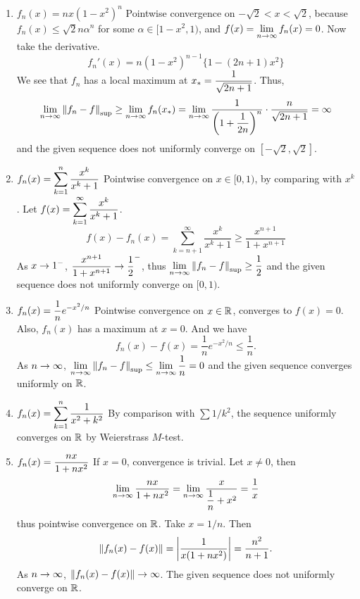 \begin{enumerate}
	\item \(f_n(x) = nx(1-x^2)^n\) \newline
	Pointwise convergence on \(-\sqrt{2} < x < \sqrt{2}\), because \(f_n(x) \leq \sqrt{2}n\alpha^n\) for some \(\alpha \in [1-x^2, 1)\), and \(f(x) = \displaystyle \lim_{n \rightarrow \infty} f_n(x) = 0\). Now take the derivative.
	\[
		f_n'(x) = n(1-x^2)^{n-1}\{1 - (2n+1)x^2\}
	\]
	We see that \(f_n\) has a local maximum at \(\displaystyle x_\ast = \frac{1}{\sqrt{2n+1}}\). Thus,
	\[
		\lim_{n\rightarrow\infty} \left\lVert f_n-f\right\rVert_{\sup} \geq \lim_{n \rightarrow \infty} f_n(x_\ast) = \lim_{n \rightarrow \infty} \frac{1}{\left(1 + \dfrac{1}{2n}\right)^n}\cdot \frac{n}{\sqrt{2n+1}} = \infty
	\]
	and the given sequence does not uniformly converge on \([-\sqrt{2}, \sqrt{2}]\).
	\item \(f_n(x) = \displaystyle \sum_{k=1}^{n} \frac{x^k}{x^k + 1}\) \newline
	Pointwise convergence on \(x\in [0, 1)\), by comparing with \(x^k\). Let \(f(x) = \displaystyle \sum_{k=1}^\infty \frac{x^k}{x^k+1}\).
	\[
		f(x) - f_n(x) = \sum_{k=n+1}^\infty \frac{x^k}{x^k+1}\geq \frac{x^{n+1}}{1+x^{n+1}}
	\]
	As \(x \rightarrow 1^-\), \(\displaystyle \frac{x^{n+1}}{1+x^{n+1}}\rightarrow \frac{1}{2}^-\), thus \(\displaystyle \lim_{n\rightarrow\infty} \left\lVert f_n-f\right\rVert_{\sup} \geq \frac{1}{2}\) and the given sequence does not uniformly converge on \([0, 1)\).
	\item \(f_n(x) = \displaystyle \frac{1}{n}e^{-x^2/n}\) \newline
	Pointwise convergence on \(x\in \mathbb{R}\), converges to \(f(x) = 0\). Also, \(f_n(x)\) has a maximum at \(x = 0\). And we have
	\[
		f_n(x) - f(x) = \frac{1}{n}e^{-x^2/n} \leq \frac{1}{n}.
	\]
	As \(n\rightarrow \infty\), \(\displaystyle \lim_{n \rightarrow \infty} \left\lVert f_n-f\right\rVert_{\sup} \leq \lim_{n \rightarrow \infty}\frac{1}{n} = 0\) and the given sequence converges uniformly on \(\mathbb{R}\).
	\item \(\displaystyle f_n(x) = \sum_{k=1}^n \frac{1}{x^2+k^2}\) \newline
	By comparison with \(\sum 1/k^2\), the sequence uniformly converges on \(\mathbb{R}\) by Weierstrass \(M\)-test.
	\item \(\displaystyle f_n(x) = \frac{nx}{1+nx^2}\) \newline
	If \(x = 0\), convergence is trivial. Let \(x \neq 0\), then
	\[
		\lim_{n \rightarrow \infty} \frac{nx}{1+nx^2} = \lim_{n \rightarrow \infty} \frac{x}{\dfrac{1}{n}+x^2} = \frac{1}{x}
	\]
	thus pointwise convergence on \(\mathbb{R}\). Take \(x = 1/n\). Then
	\[
		\left\lVert f_n(x)-f(x)\right\rVert = \left|\frac{1}{x(1+nx^2)}\right| = \frac{n^2}{n+1}.
	\]
	As \(n\rightarrow \infty\), \(\left\lVert f_n(x)-f(x)\right\rVert \rightarrow \infty\). The given sequence does not uniformly converge on \(\mathbb{R}\).

\end{enumerate}
